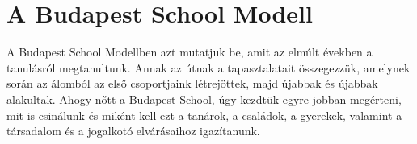 \hypertarget{a-budapest-school-modell}{%
\section{A Budapest School Modell}\label{a-budapest-school-modell}}

A Budapest School Modellben azt mutatjuk be, amit az elmúlt években a
tanulásról megtanultunk. Annak az útnak a tapasztalatait összegezzük,
amelynek során az álomból az első csoportjaink létrejöttek, majd újabbak és
újabbak alakultak. Ahogy nőtt a Budapest School, úgy kezdtük egyre
jobban megérteni, mit is csinálunk és miként kell ezt a tanárok, a
családok, a gyerekek, valamint a társadalom és a jogalkotó elvárásaihoz
igazítanunk.





